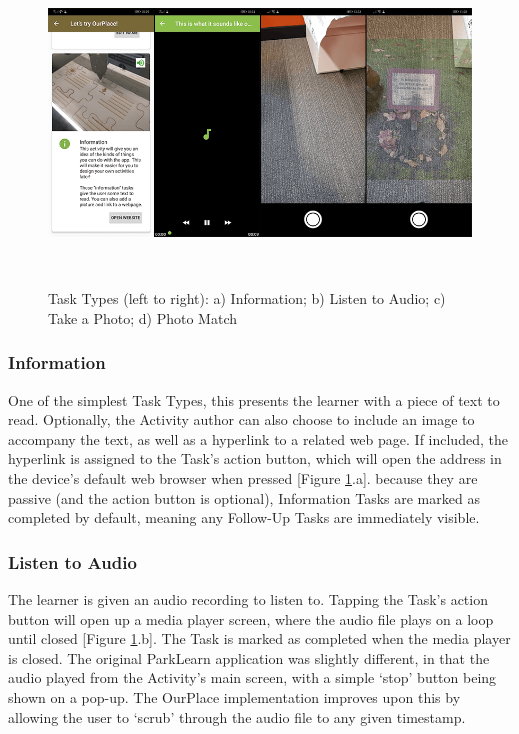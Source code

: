 ~\label{tab:TaskTypes}


\begin{figure}
  \centering
  \includegraphics[width=1\columnwidth]{images/chapter05/tasktypes1.png}
  \caption[Task Types (part 1)]{Task Types (left to right): a) Information; b) Listen to Audio; c) Take a Photo; d) Photo Match}~\label{fig:TaskTypes1}
\end{figure}

\subsubsection*{Information}
One of the simplest Task Types, this presents the learner with a piece of text to read. Optionally, the Activity author can also choose to include an image to accompany the text, as well as a hyperlink to a related web page. If included, the hyperlink is assigned to the Task's action button, which will open the address in the device's default web browser when pressed [Figure \ref{fig:TaskTypes1}.a]. because they are passive (and the action button is optional), Information Tasks are marked as completed by default, meaning any Follow-Up Tasks are immediately visible.

\subsubsection*{Listen to Audio}
The learner is given an audio recording to listen to. Tapping the Task's action button will open up a media player screen, where the audio file plays on a loop until closed [Figure \ref{fig:TaskTypes1}.b]. The Task is marked as completed when the media player is closed. The original ParkLearn application was slightly different, in that the audio played from the Activity's main screen, with a simple `stop' button being shown on a pop-up. The OurPlace implementation improves upon this by allowing the user to `scrub' through the audio file to any given timestamp.
    
